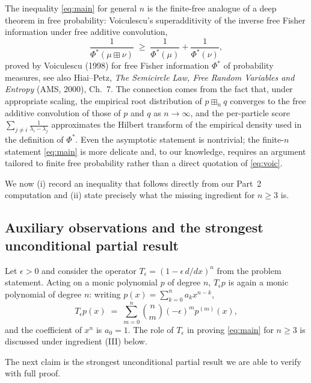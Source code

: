 \documentclass[12pt]{article}
\theoremstyle{definition}
\begin{document}
The inequality \eqref{eq:main} for general $n$ is the finite-free analogue of a deep theorem in free probability: Voiculescu's superadditivity of the inverse free Fisher information under free additive convolution,
\begin{equation}\label{eq:voic}
\frac{1}{\Phi^*(\mu\boxplus\nu)} \;\geq\; \frac{1}{\Phi^*(\mu)}+\frac{1}{\Phi^*(\nu)},
\end{equation}
proved by Voiculescu (1998) for free Fisher information $\Phi^*$ of probability measures, see also Hiai--Petz, \emph{The Semicircle Law, Free Random Variables and Entropy} (AMS, 2000), Ch.~7. The connection comes from the fact that, under appropriate scaling, the empirical root distribution of $p\boxplus_n q$ converges to the free additive convolution of those of $p$ and $q$ as $n\to\infty$, and the per-particle score $\sum_{j\neq i}\frac{1}{\lambda_i-\lambda_j}$ approximates the Hilbert transform of the empirical density used in the definition of $\Phi^*$. Even the asymptotic statement is nontrivial; the finite-$n$ statement \eqref{eq:main} is more delicate and, to our knowledge, requires an argument tailored to finite free probability rather than a direct quotation of \eqref{eq:voic}.

We now (i) record an inequality that follows directly from our Part~2 computation and (ii) state precisely what the missing ingredient for $n\geq 3$ is.

\subsection{Auxiliary observations and the strongest unconditional partial result}

Let $\epsilon>0$ and consider the operator $T_\epsilon=(1-\epsilon\,d/dx)^n$ from the problem statement. Acting on a monic polynomial $p$ of degree $n$, $T_\epsilon p$ is again a monic polynomial of degree $n$: writing $p(x)=\sum_{k=0}^n a_k x^{n-k}$,
\[
T_\epsilon p(x) \;=\; \sum_{m=0}^n\binom{n}{m}(-\epsilon)^m p^{(m)}(x),
\]
and the coefficient of $x^n$ is $a_0=1$. The role of $T_\epsilon$ in proving \eqref{eq:main} for $n\geq 3$ is discussed under ingredient (III) below.

The next claim is the strongest unconditional partial result we are able to verify with full proof.
\end{document}
